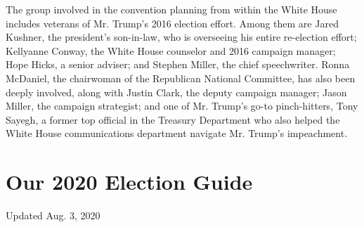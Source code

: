 The group involved in the convention planning from within the White
House includes veterans of Mr. Trump's 2016 election effort. Among them
are Jared Kushner, the president's son-in-law, who is overseeing his
entire re-election effort; Kellyanne Conway, the White House counselor
and 2016 campaign manager; Hope Hicks, a senior adviser; and Stephen
Miller, the chief speechwriter. Ronna McDaniel, the chairwoman of the
Republican National Committee, has also been deeply involved, along with
Justin Clark, the deputy campaign manager; Jason Miller, the campaign
strategist; and one of Mr. Trump's go-to pinch-hitters, Tony Sayegh, a
former top official in the Treasury Department who also helped the White
House communications department navigate Mr. Trump's impeachment.

\hypertarget{our-2020-election-guide}{%
\section{Our 2020 Election Guide}\label{our-2020-election-guide}}

Updated Aug. 3, 2020

